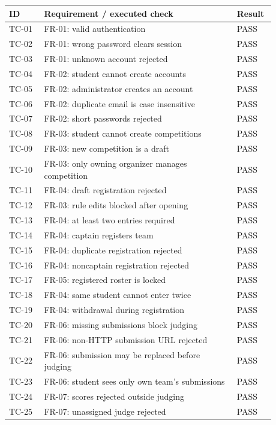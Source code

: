 \small\begin{longtable}{p{0.12\linewidth}p{0.66\linewidth}p{0.1\linewidth}}\toprule ID & Requirement / executed check & Result\\\midrule\endhead
TC-01 & FR-01: valid authentication & PASS\\
TC-02 & FR-01: wrong password clears session & PASS\\
TC-03 & FR-01: unknown account rejected & PASS\\
TC-04 & FR-02: student cannot create accounts & PASS\\
TC-05 & FR-02: administrator creates an account & PASS\\
TC-06 & FR-02: duplicate email is case insensitive & PASS\\
TC-07 & FR-02: short passwords rejected & PASS\\
TC-08 & FR-03: student cannot create competitions & PASS\\
TC-09 & FR-03: new competition is a draft & PASS\\
TC-10 & FR-03: only owning organizer manages competition & PASS\\
TC-11 & FR-04: draft registration rejected & PASS\\
TC-12 & FR-03: rule edits blocked after opening & PASS\\
TC-13 & FR-04: at least two entries required & PASS\\
TC-14 & FR-04: captain registers team & PASS\\
TC-15 & FR-04: duplicate registration rejected & PASS\\
TC-16 & FR-04: noncaptain registration rejected & PASS\\
TC-17 & FR-05: registered roster is locked & PASS\\
TC-18 & FR-04: same student cannot enter twice & PASS\\
TC-19 & FR-04: withdrawal during registration & PASS\\
TC-20 & FR-06: missing submissions block judging & PASS\\
TC-21 & FR-06: non-HTTP submission URL rejected & PASS\\
TC-22 & FR-06: submission may be replaced before judging & PASS\\
TC-23 & FR-06: student sees only own team's submissions & PASS\\
TC-24 & FR-07: scores rejected outside judging & PASS\\
TC-25 & FR-07: unassigned judge rejected & PASS\\

\end{longtable}
